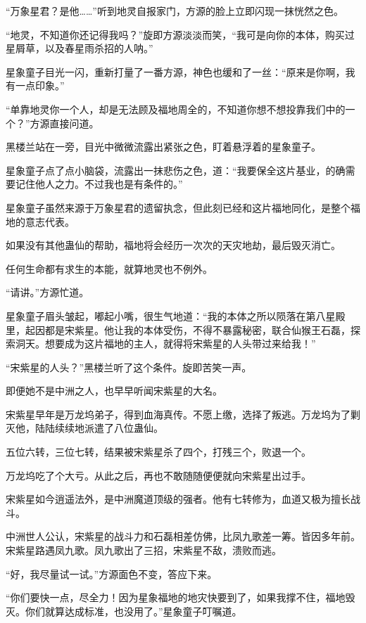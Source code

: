 
\begin{this_body}

“万象星君？是他……”听到地灵自报家门，方源的脸上立即闪现一抹恍然之色。

“地灵，不知道你还记得我吗？”旋即方源淡淡而笑，“我可是向你的本体，购买过星屑草，以及春星雨杀招的人呐。”

星象童子目光一闪，重新打量了一番方源，神色也缓和了一丝：“原来是你啊，我有一点印象。”

“单靠地灵你一个人，却是无法顾及福地周全的，不知道你想不想投靠我们中的一个？”方源直接问道。

黑楼兰站在一旁，目光中微微流露出紧张之色，盯着悬浮着的星象童子。

星象童子点了点小脑袋，流露出一抹悲伤之色，道：“我要保全这片基业，的确需要记住他人之力。不过我也是有条件的。”

星象童子虽然来源于万象星君的遗留执念，但此刻已经和这片福地同化，是整个福地的意志代表。

如果没有其他蛊仙的帮助，福地将会经历一次次的天灾地劫，最后毁灭消亡。

任何生命都有求生的本能，就算地灵也不例外。

“请讲。”方源忙道。

星象童子眉头皱起，嘟起小嘴，很生气地道：“我的本体之所以陨落在第八星殿里，起因都是宋紫星。他让我的本体受伤，不得不暴露秘密，联合仙猴王石磊，探索洞天。想要成为这片福地的主人，就得将宋紫星的人头带过来给我！”

“宋紫星的人头？”黑楼兰听了这个条件。旋即苦笑一声。

即便她不是中洲之人，也早早听闻宋紫星的大名。

宋紫星早年是万龙坞弟子，得到血海真传。不愿上缴，选择了叛逃。万龙坞为了剿灭他，陆陆续续地派遣了八位蛊仙。

五位六转，三位七转，结果被宋紫星杀了四个，打残三个，败退一个。

万龙坞吃了个大亏。从此之后，再也不敢随随便便就向宋紫星出过手。

宋紫星如今逍遥法外，是中洲魔道顶级的强者。他有七转修为，血道又极为擅长战斗。

中洲世人公认，宋紫星的战斗力和石磊相差仿佛，比凤九歌差一筹。皆因多年前。宋紫星路遇凤九歌。凤九歌出了三招，宋紫星不敌，溃败而逃。

“好，我尽量试一试。”方源面色不变，答应下来。

“你们要快一点，尽全力！因为星象福地的地灾快要到了，如果我撑不住，福地毁灭。你们就算达成标准，也没用了。”星象童子叮嘱道。


\end{this_body}

